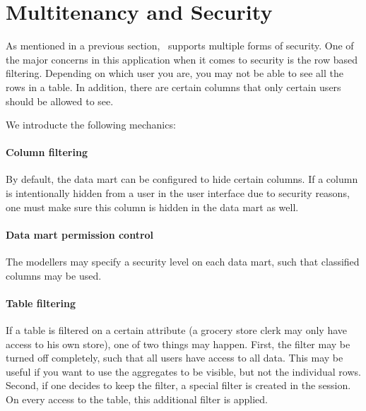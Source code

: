 \section{Multitenancy and Security}
As mentioned in a previous section,  \genusSoftware~supports multiple forms of security. One of the major concerns in this application when it comes to security is the row based filtering. Depending on which user you are, you may not be able to see all the rows in a table. In addition, there are certain columns that only certain users should be allowed to see.

We introducte the following mechanics:

\paragraph{Column filtering}
\label{par:Column filtering}
By default, the data mart can be configured to hide certain columns. If a column is intentionally  hidden from a user in the user interface due to security reasons, one must make sure this column is hidden in the data mart as well.

\paragraph{Data mart permission control}
\label{par:Data mart permission control}
The modellers may specify a security level on each data mart, such that classified columns may be used.

\paragraph{Table filtering}
\label{par:Table filtering}
If a table is filtered on a certain attribute (a grocery store clerk may only have access to his own store), one of two things may happen. First, the filter may be turned off completely, such that all users have access to all data. This may be useful if you want to use the aggregates to be visible, but not the individual rows. Second, if one decides to keep the filter, a special filter is created in the session. On every access to the table, this additional filter is applied.
